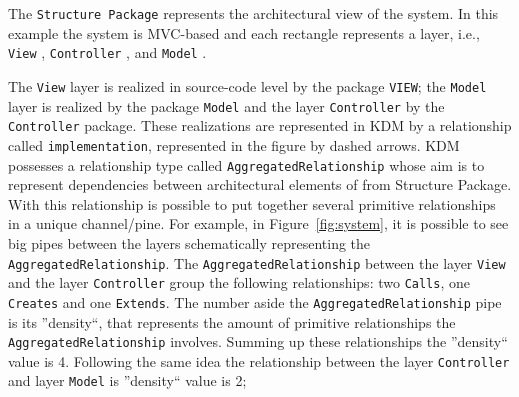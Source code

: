 The \texttt{Structure Package} represents the architectural view of the system. In this example the system is MVC-based and each rectangle represents a layer, i.e., \texttt{View} , \texttt{Controller} , and \texttt{Model} .



The \texttt{View} layer is realized in source-code level by the package \texttt{VIEW}; the \texttt{Model} layer is realized by the package \texttt{Model} and the layer \texttt{Controller} by the \texttt{Controller} package. These realizations are represented in KDM by a relationship called \texttt{implementation}, represented in the figure by dashed arrows. KDM possesses a relationship type called \texttt{AggregatedRelationship} whose aim is to represent dependencies between architectural elements of from Structure Package. With this relationship is possible to put together several primitive relationships in a unique channel/pine. For example, in Figure~\ref{fig:system}, it is possible to see big  pipes between the layers schematically representing the \texttt{AggregatedRelationship}. 
%
%
%
%
%
The \texttt{AggregatedRelationship} between the layer \texttt{View} and the layer \texttt{Controller} group the following relationships: two \texttt{Calls}, one \texttt{Creates} and one \texttt{Extends}. The number aside the \texttt{AggregatedRelationship} pipe is its ''density``, that represents the amount of primitive relationships the \texttt{AggregatedRelationship} involves. 
%
Summing up these relationships the ''density`` value is 4. Following the same idea the relationship between the layer \texttt{Controller} and layer \texttt{Model} is ''density`` value is 2;  
  
